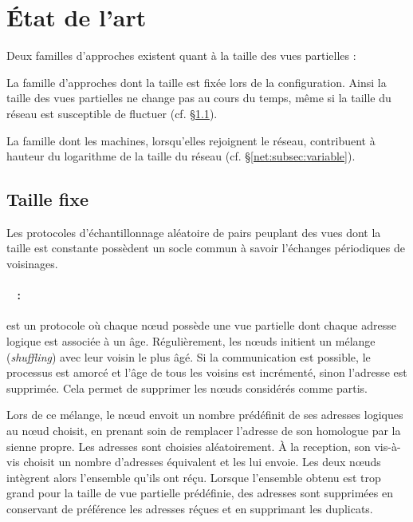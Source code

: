 
\section{État de l'art}
\label{net:sec:stateoftheart}
Deux familles d'approches existent quant à la taille des vues partielles :
\begin{inparaenum}[(i)]
\item La famille d'approches dont la taille est fixée lors de la
  configuration. Ainsi la taille des vues partielles ne change pas au cours du
  temps, même si la taille du réseau est susceptible de fluctuer
  (cf. §\ref{net:subsec:fixed}).
\item La famille dont les machines, lorsqu'elles rejoignent le réseau,
  contribuent à hauteur du logarithme de la taille du réseau
  (cf. §\ref{net:subsec:variable}).
\end{inparaenum}

\subsection{Taille fixe}
\label{net:subsec:fixed}

Les protocoles d'échantillonnage aléatoire de pairs peuplant des vues dont la
taille est constante possèdent un socle commun à savoir l'échanges périodiques
de voisinages.

\paragraph{\CYCLON~\cite{voulgaris2005cyclon} :} est un protocole où chaque nœud
possède une vue partielle dont chaque adresse logique est associée à un
âge. Régulièrement, les nœuds initient un mélange (\emph{shuffling}) avec leur
voisin le plus âgé. Si la communication est possible, le processus est amorcé et
l'âge de tous les voisins est incrémenté, sinon l'adresse est supprimée. Cela
permet de supprimer les nœuds considérés comme partis.

\noindent Lors de ce mélange, le nœud envoit un nombre prédéfinit de ses
adresses logiques au nœud choisit, en prenant soin de remplacer l'adresse de son
homologue par la sienne propre. Les adresses sont choisies aléatoirement. À la
reception, son vis-à-vis choisit un nombre d'adresses équivalent et les lui
envoie. Les deux nœuds intègrent alors l'ensemble qu'ils ont réçu. Lorsque
l'ensemble obtenu est trop grand pour la taille de vue partielle prédéfinie, des
adresses sont supprimées en conservant de préférence les adresses réçues et en
supprimant les duplicats.
  
